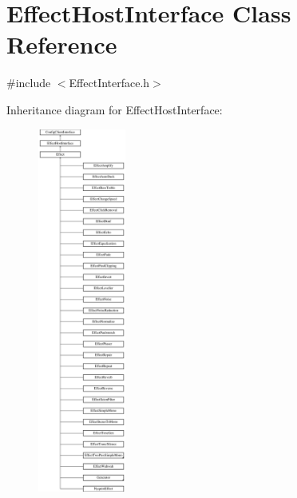 \hypertarget{class_effect_host_interface}{}\section{Effect\+Host\+Interface Class Reference}
\label{class_effect_host_interface}


{\ttfamily \#include $<$Effect\+Interface.\+h$>$}

Inheritance diagram for Effect\+Host\+Interface\+:\begin{figure}[H]
\begin{center}
\leavevmode
\includegraphics[height=12.000000cm]{class_effect_host_interface}
\end{center}
\end{figure}
